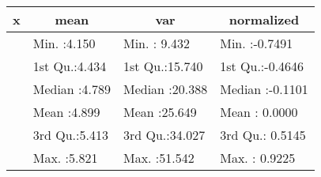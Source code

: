 \begin{table}[!tbp]
\begin{center}
\begin{tabular}{llll}
\hline\hline
\multicolumn{1}{l}{x}&\multicolumn{1}{c}{     mean}&\multicolumn{1}{c}{     var}&\multicolumn{1}{c}{  normalized}\tabularnewline
\hline
&Min.   :4.150  &Min.   : 9.432  &Min.   :-0.7491  \tabularnewline
&1st Qu.:4.434  &1st Qu.:15.740  &1st Qu.:-0.4646  \tabularnewline
&Median :4.789  &Median :20.388  &Median :-0.1101  \tabularnewline
&Mean   :4.899  &Mean   :25.649  &Mean   : 0.0000  \tabularnewline
&3rd Qu.:5.413  &3rd Qu.:34.027  &3rd Qu.: 0.5145  \tabularnewline
&Max.   :5.821  &Max.   :51.542  &Max.   : 0.9225  \tabularnewline
\hline
\end{tabular}\end{center}

\end{table}

